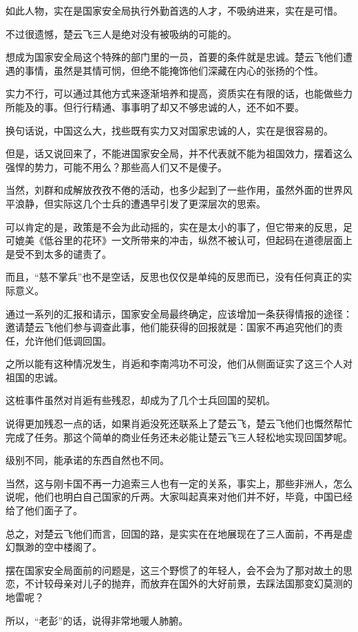 如此人物，实在是国家安全局执行外勤首选的人才，不吸纳进来，实在是可惜。

不过很遗憾，楚云飞三人是绝对没有被吸纳的可能的。

想成为国家安全局这个特殊的部门里的一员，首要的条件就是忠诚。楚云飞他们遭遇的事情，虽然是其情可悯，但绝不能掩饰他们深藏在内心的张扬的个性。

实力不行，可以通过其他方式来逐渐培养和提高，资质实在有限的话，也能做些力所能及的事。但行行精通、事事明了却又不够忠诚的人，还不如不要。

换句话说，中国这么大，找些既有实力又对国家忠诚的人，实在是很容易的。

但是，话又说回来了，不能进国家安全局，并不代表就不能为祖国效力，摆着这么强悍的势力，可能不用么？那些高人们又不是傻子。

当然，刘群和成解放孜孜不倦的活动，也多少起到了一些作用，虽然外面的世界风平浪静，但实际这几个士兵的遭遇早引发了更深层次的思索。

可以肯定的是，政策是不会为此动摇的，实在是太小的事了，但它带来的反思，足可媲美《低谷里的花环》一文所带来的冲击，纵然不被认可，但起码在道德层面上是受不到太多的谴责了。

而且，“慈不掌兵”也不是空话，反思也仅仅是单纯的反思而已，没有任何真正的实际意义。

通过一系列的汇报和请示，国家安全局最终确定，应该增加一条获得情报的途径：邀请楚云飞他们参与调查此事，他们能获得的回报就是：国家不再追究他们的责任，允许他们低调回国。

之所以能有这种情况发生，肖逅和李南鸿功不可没，他们从侧面证实了这三个人对祖国的忠诚。

这桩事件虽然对肖逅有些残忍，却成为了几个士兵回国的契机。

说得更加残忍一点的话，如果肖逅没死还联系上了楚云飞，楚云飞他们也慨然帮忙完成了任务。那这个简单的商业任务还未必能让楚云飞三人轻松地实现回国梦呢。

级别不同，能承诺的东西自然也不同。

当然，这与刚卡国不再一力追索三人也有一定的关系，事实上，那些非洲人，怎么说呢，他们也明白自己国家的斤两。大家叫起真来对他们并不好，毕竟，中国已经给了他们面子了。

总之，对楚云飞他们而言，回国的路，是实实在在地展现在了三人面前，不再是虚幻飘渺的空中楼阁了。

摆在国家安全局面前的问题是，这三个野惯了的年轻人，会不会为了那对故土的思恋，不计较母亲对儿子的抛弃，而放弃在国外的大好前景，去踩法国那变幻莫测的地雷呢？

所以，“老彭”的话，说得非常地暖人肺腑。

